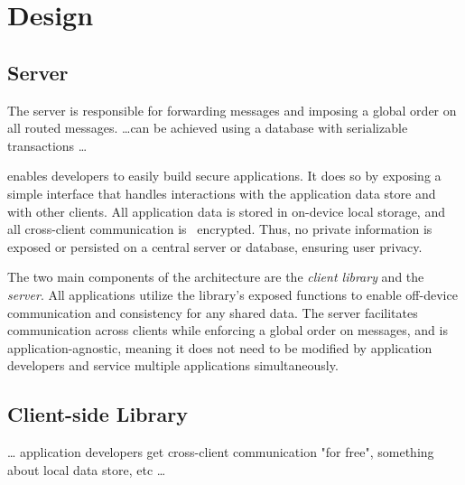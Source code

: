 \section{Design}



\subsection{Server}
The server is responsible for forwarding messages and imposing a global 
order on all routed messages. \dots can be achieved using a database with
serializable transactions \dots

\name{} enables developers to easily build secure applications. It does
so by exposing a simple interface that handles interactions with the
application data store and with other clients. All application data is 
stored in on-device local storage, and all cross-client communication is \
encrypted. Thus, no private information is exposed or persisted on a 
central server or database, ensuring user privacy. 

The two main components of the \name{} architecture are the 
\textit{client library} and the \textit{\name{} server}. All \name{} 
applications utilize the library's exposed functions to enable 
off-device communication and consistency for any shared data. The server
facilitates communication across clients while enforcing a global order 
on messages, and is application-agnostic, meaning it does not need to be 
modified by application developers and service multiple applications 
simultaneously. 

\subsection{Client-side Library}
\dots {} 
application developers get cross-client communication "for free",
something about local data store, etc \dots
{}

